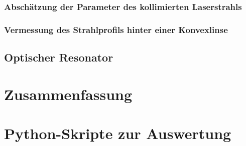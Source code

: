 \documentclass[11pt,a4paper,oneside]{scrartcl}
\begin{document}
\subsubsection{Abschätzung der Parameter des kollimierten Laserstrahls}
\subsubsection{Vermessung des Strahlprofils hinter einer Konvexlinse}
\subsection{Optischer Resonator}
\section{Zusammenfassung}
\newpage

 

\appendix

\section{Python-Skripte zur Auswertung}
\end{document}
